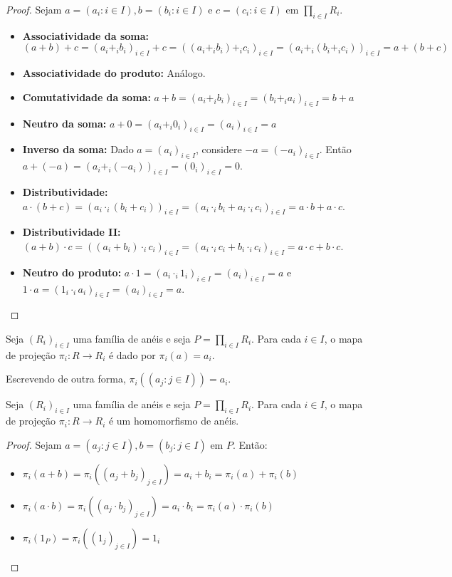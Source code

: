 \begin{proof}
    Sejam $a=(a_i: i \in I), b=(b_i: i \in I)$ e $c=(c_i: i \in I)$ em $\prod_{i \in I}R_i$.
    \begin{itemize}
        \item \textbf{Associatividade da soma:} $(a+b)+c=(a_i+_i b_i)_{i \in I}+c=((a_i+_i b_i)+_ic_i)_{i \in I}=(a_i+_i (b_i+_i c_i))_{i \in I}=a+(b+c)$
        \item \textbf{Associatividade do produto:} Análogo.
        \item \textbf{Comutatividade da soma:} $a+b=(a_i+_i b_i)_{i \in I}=(b_i+_i a_i)_{i \in I}=b+a$
        \item \textbf{Neutro da soma:} $a+0=(a_i+_i 0_i)_{i \in I}=(a_i)_{i \in I}=a$
        \item \textbf{Inverso da soma:} Dado $a=(a_i)_{i \in I}$, considere $-a=(-a_i)_{i \in I}$. Então $a+(-a)=(a_i+_i (-a_i))_{i \in I}=(0_i)_{i \in I}=0$.
        \item \textbf{Distributividade:} $a\cdot (b+c)=(a_i\cdot _i (b_i+c_i))_{i \in I}=(a_i\cdot _i b_i+a_i\cdot _i c_i)_{i \in I}=a\cdot b+a\cdot c$.
        \item \textbf{Distributividade II:} $(a+b)\cdot c=((a_i+b_i)\cdot _i c_i)_{i \in I}=(a_i\cdot _i c_i+b_i\cdot _i c_i)_{i \in I}=a\cdot c+b\cdot c$.
        \item \textbf{Neutro do produto:} $a\cdot 1=(a_i\cdot _i 1_i)_{i \in I}=(a_i)_{i \in I}=a$ e $1\cdot a=(1_i\cdot _i a_i)_{i \in I}=(a_i)_{i \in I}=a$.
    \end{itemize}
\end{proof}
\begin{definition}
    Seja $(R_i)_{i \in I}$ uma família de anéis e seja $P=\prod_{i \in I}R_i$.
    Para cada $i \in I$, o mapa de projeção $\pi_i:R\rightarrow R_i$ é dado por $\pi_i(a)=a_i$.

    Escrevendo de outra forma, $\pi_i((a_j: j \in I))=a_i$.
\end{definition}

\begin{lemma}
    Seja $(R_i)_{i \in I}$ uma família de anéis e seja $P=\prod_{i \in I}R_i$.
    Para cada $i \in I$, o mapa de projeção $\pi_i:R\rightarrow R_i$ é um homomorfismo de anéis.
\end{lemma}
\begin{proof}
    Sejam $a=(a_j: j \in I), b=(b_j: j \in I)$ em $P$.
    Então:
    \begin{itemize}
        \item $\pi_i(a+b)=\pi_i((a_j+b_j)_{j \in I})=a_i+b_i=\pi_i(a)+\pi_i(b)$
        \item $\pi_i(a\cdot b)=\pi_i((a_j\cdot b_j)_{j \in I})=a_i\cdot b_i=\pi_i(a)\cdot \pi_i(b)$
        \item $\pi_i(1_P)=\pi_i((1_j)_{j \in I})=1_{i}$
    \end{itemize}
\end{proof}

